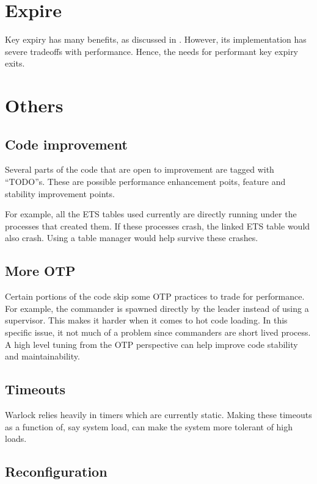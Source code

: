 \section{Expire}

Key expiry has many benefits, as discussed in \citet{a.n.d.expiry}. However, its
implementation has severe tradeoffs with performance. Hence, the needs for
performant key expiry exits.

\section{Others}

\subsection{Code improvement}

Several parts of the code that are open to improvement are tagged with 
``TODO''s. These are possible performance enhancement poits, feature and
stability improvement points. 

For example, all the ETS tables used currently
are directly running under the processes that created them. If these processes
crash, the linked ETS table would also crash. Using a table manager would
help survive these crashes.

\subsection{More OTP}

Certain portions of the code skip some OTP practices to trade for performance.
For example, the commander is spawned directly by the leader instead of using
a supervisor. This makes it harder when it comes to hot code loading. In this
specific issue, it not much of a problem since commanders are short lived
process. A high level tuning from the OTP perspective can help improve code
stability and maintainability.

\subsection{Timeouts}

Warlock relies heavily in timers which are currently static. Making these
timeouts as a function of, say system load, can make the system more tolerant
of high loads.

\subsection{Reconfiguration}


